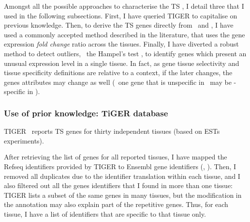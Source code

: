 Amongst all the possible approaches to characterise the \gls{TS} \pcgs,
I detail three that I used in the following subsections.
First, I have queried \gls{TIGER} to capitalise on previous knowledge.
Then, to derive the \gls{TS} genes directly from \setOne\ and \setTwo,
I have used a commonly accepted method described in the literature,
that uses the gene expression \emph{fold change} ratio across the tissues.
Finally, I have diverted a robust method to detect outliers,
\ie\ the Hampel's test ,
to identify genes which present an unusual expression level in a single tissue.
In fact, as gene tissue selectivity and tissue specificity definitions are
relative to a context,
if the later changes,
the genes attributes may change as well
(\eg\ one gene that is unspecific in \setTwo\ may be \heart{}-specific in \setOne).


\subsubsection{Use of prior knowledge: TiGER database}\label{subsub:Tiger}

\gls{TIGER}~ reports \gls{TS} genes for thirty independent tissues
(based on \glspl{EST} experiments).

After retrieving the list of genes for all reported tissues,
I have mapped the \gls{Refseq} identifiers provided by \gls{TIGER}
to \gls{Ensembl} gene identifiers (, ).
Then, I removed all duplicates due to the identifier translation within each tissue,
and I also filtered out all the genes identifiers that
I found in more than one tissue:
\gls{TIGER} lists a subset of the same genes in many tissues,
but the modification in the annotation may also explain part of the
repetitive genes.
Thus, for each tissue,
I have a list of identifiers that are specific to that tissue only.


